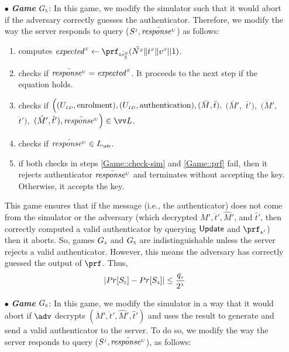 \begin{itemize}
\item[$\bullet$] \textit{\textbf{Game}}  $G_{\scriptscriptstyle  5}$: In this game, we modify the simulator such that it would abort if
the adversary correctly guesses the authenticator. Therefore, we modify the way the server responds to  query {\send($S^{\scriptscriptstyle  j},   \bar{\mathit{response}^{\scriptscriptstyle U}}$)} as follows: 

\begin{enumerate}
%
\item computes $\VS{\mathit{expected}} \gets \prf_{\sss\bar{\VS{\keyt_{\sss3}}}}(\ddot{\VS{\nonce}}  \| \VS{\trans} \| \VS{\verifier}|| 1)$.
%
\item checks if $\bar{\mathit{response}^{\scriptscriptstyle U}}=\mathit{expected}^{\scriptscriptstyle S}$. It proceeds to the next step if the equation holds. 
%
\item\label{Game::check-sim} checks if $\Big((U_{\scriptscriptstyle  ID},  \text{enrolment}), (U_{\scriptscriptstyle  ID},  \text{authentication}), (\bar M, \bar t),$ $ (\bar M',$ $ \bar t'),$ $ (\ddot M', $ $\ddot t'), $ $(\hat M', \hat t'), \bar{\VC{\mathit{response}}}\Big)\in \vv L$.

\item\label{Game::prf} checks if $ \bar{\VC{\mathit{response}}}\in L_{\sss \adv}$. 
%
\item if both checks in steps \ref{Game::check-sim} and \ref{Game::prf} fail, then it rejects authenticator $\bar{\mathit{response}^{\scriptscriptstyle U}}$ and terminates without accepting the key. Otherwise, it accepts the key. 
%
\end{enumerate}
This game ensures that if the message (i.e., the authenticator) does not come from the simulator or the adversary (which decrypted $\ddot M',\ddot t', \hat M'$, and  $\hat t'$, then correctly computed a valid authenticator by querying $\mathsf{Update}$ and $\prf_{\sss  k'}$) then it aborts. So, games $G_{\scriptscriptstyle  4}$ and $G_{\scriptscriptstyle  5}$ are indistinguishable unless the server rejects a valid authenticator. However, this means the adversary has correctly guessed the output of $\prf$. Thus, 
%
\begin{equation}\label{eq::game_5}
|Pr[S_{\scriptscriptstyle  5}]-Pr[S_{\scriptscriptstyle  4}]|\leq \frac{q_{\scriptscriptstyle  s}}{2^{\scriptscriptstyle \lambda}}
\end{equation}



\item[$\bullet$] \textit{\textbf{Game}}  $G_{\scriptscriptstyle  6}$: 
 In this game, we modify the simulator in a way that it would abort if $\adv$ decrypts $ (\ddot M', \ddot t', \hat M', \hat t')$ and uses the result to generate and send a valid authenticator to the server. To do so, we modify the way the server responds to  query {\send($S^{\scriptscriptstyle  j},   \bar{\mathit{response}^{\scriptscriptstyle U}}$)}, as follows: 


\end{itemize}

